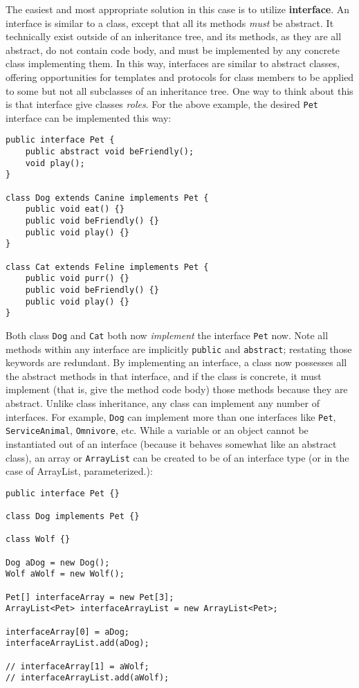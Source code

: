 \documentclass{tufte-handout}
\begin{document}
    The easiest and most appropriate solution in this case is to utilize \textbf{interface}. An interface is similar to a class, except that all its methods \emph{must} be abstract. It technically exist outside of an inheritance tree, and its methods, as they are all abstract, do not contain code body, and must be implemented by any concrete class implementing them. In this way, interfaces are similar to abstract classes, offering opportunities for templates and protocols for class members to be applied to some but not all subclasses of an inheritance tree. One way to think about this is that interface give classes \emph{roles}. For the above example, the desired \texttt{Pet} interface can be implemented this way: 

    \begin{lstlisting}
public interface Pet {
    public abstract void beFriendly();
    void play();
}

class Dog extends Canine implements Pet {
    public void eat() {}
    public void beFriendly() {}
    public void play() {}
}

class Cat extends Feline implements Pet {
    public void purr() {}
    public void beFriendly() {}
    public void play() {}
}
    \end{lstlisting}

    Both class \texttt{Dog} and \texttt{Cat} both now \emph{implement} the interface \texttt{Pet} now. Note all methods within any interface are implicitly \texttt{public} and \texttt{abstract}; restating those keywords are redundant. By implementing an interface, a class now possesses all the abstract methods in that interface, and if the class is concrete, it must implement (that is, give the method code body) those methods because they are abstract. Unlike class inheritance, any class can implement any number of interfaces. For example, \texttt{Dog} can implement more than one interfaces like \texttt{Pet}, \texttt{ServiceAnimal}, \texttt{Omnivore}, etc. While a variable or an object cannot be instantiated out of an interface (because it behaves somewhat like an abstract class), an array or \texttt{ArrayList} can be created to be of an interface type (or in the case of ArrayList, parameterized.):

    \begin{lstlisting}
public interface Pet {}

class Dog implements Pet {}

class Wolf {}

Dog aDog = new Dog();
Wolf aWolf = new Wolf();

Pet[] interfaceArray = new Pet[3];
ArrayList<Pet> interfaceArrayList = new ArrayList<Pet>;

interfaceArray[0] = aDog;
interfaceArrayList.add(aDog);

// interfaceArray[1] = aWolf;
// interfaceArrayList.add(aWolf);
    \end{lstlisting}
\end{document}
